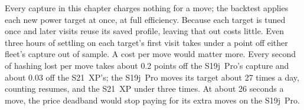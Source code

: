 Every capture in this chapter charges nothing for a move; the backtest applies each new power target at once, at full efficiency. %
Because each target is tuned once and later visits reuse its saved profile, leaving that out costs little. Even three hours of settling on each target's first visit takes under a point off either fleet's capture out of sample. %
A cost per move would matter more. Every second of hashing lost per move takes about 0.2 points off the S19j~Pro's capture and about 0.03 off the S21~XP's; the S19j~Pro moves its target about 27 times a day, counting resumes, and the S21~XP under three times. At about 26 seconds a move, the price deadband would stop paying for its extra moves on the S19j~Pro. %

